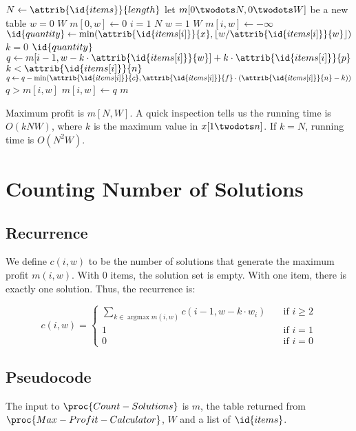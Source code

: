 \documentclass{article}
\newcommand{\floor}[1]{\left\lfloor #1 \right\rfloor}
\newcommand{\itemattr}[1]{\attrib{\id{items[i]}}{#1}}
\DeclareMathOperator*{\argmax}{argmax}
\begin{document}
\begin{codebox}
\li $N \gets \attrib{\id{items}}{length}$
\li let $m[0 \twodots N, 0 \twodots W]$ be a new table
\li \For $w = 0$ \To $W$ \Do
\li 	$m[0, w] \gets 0$
	\End
\li \For $i = 1$ \To $N$ \Do
\li 	\For $w = 1$ \To $W$ \Do
\li 		$m[i, w] \gets -\infty$
\li 		$\id{quantity} \gets \min(\itemattr{x}, \floor{w/\itemattr{w}})$
\li			\For $k = 0$ \To $\id{quantity}$ \Do
\li 			$q \gets m[i-1, w-k \cdot \itemattr{w}] + k \cdot \itemattr{p}$
\li 			\If $k < \itemattr{n}$ \Then
\li 				$q \gets q - \min(\itemattr{c}, \itemattr{f} \cdot (\itemattr{n} - k))$
				\End
\li 			\If $q > m[i, w]$ \Then
\li 				$m[i, w] \gets q$
				\End
			\End		
		\End
	\End
\li \Return $m$
\end{codebox}

Maximum profit is $m[N, W]$. A quick inspection tells us the running time is $O(kNW)$, where $k$ is the maximum value in $x[1 \twodots n]$. If $k=N$, running time is $O(N^2W)$.

\section{Counting Number of Solutions}

\subsection{Recurrence}
We define $c(i, w)$ to be the number of solutions that generate the maximum profit $m(i, w)$. With 0 items, the solution set is empty. With one item, there is exactly one solution. Thus, the recurrence is:

\[ c(i, w) =
\begin{cases}
\sum_{k \in \argmax{m(i, w)}} c(i-1, w-k \cdot w_i) & \quad \text{if } i \geq 2\\
1 & \quad \text{if } i = 1\\
0 & \quad \text{if } i = 0
\end{cases}
\]

\subsection{Pseudocode}
The input to $\proc{Count-Solutions}$ is $m$, the table returned from $\proc{Max-Profit-Calculator}$, $W$ and a list of $\id{items}$.
\end{document}
